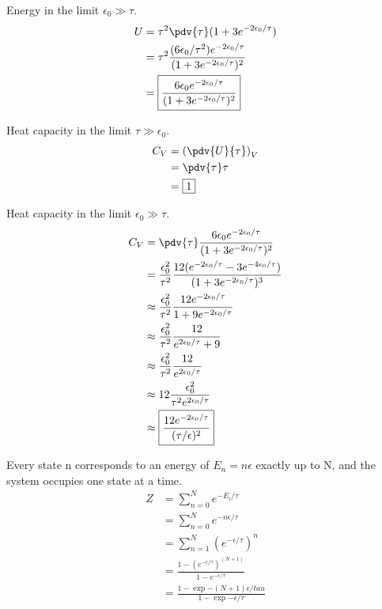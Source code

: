 \documentclass[newpage]{homework}
\begin{document}
Energy in the limit $\epsilon_0 \gg \tau$.
\begin{align*}
    U	&=	\tau^2 \pdv{\tau} (1 + 3e^{-2\epsilon_0/\tau})	\\
        &=	\tau^2 \frac{(6\epsilon_0/\tau^2) e^{-2\epsilon_0/\tau}}{(1 + 3e^{-2\epsilon_0/\tau})^2}	\\
        &= \boxed{\frac{6\epsilon_0 e^{-2\epsilon_0/\tau}}{(1 + 3e^{-2\epsilon_0/\tau})^2}}	\\
\end{align*}

Heat capacity in the limit $\tau \gg \epsilon_0$.
\begin{align*}
    C_V	&=	\left(\pdv{U}{\tau}\right)_V	\\
        &=  \pdv{\tau} \tau \\
        &=  \boxed{1}
\end{align*}

Heat capacity in the limit $\epsilon_0 \gg \tau$.
\begin{align*}
    C_V	&=	\pdv{\tau} \frac{6\epsilon_0 e^{-2\epsilon_0/\tau}}{(1 + 3e^{-2\epsilon_0/\tau})^2}	\\
        &=  \frac{\epsilon_0^2}{\tau^2} \frac{12(e^{-2\epsilon_0/\tau} - 3e^{-4\epsilon_0/\tau})}{(1 + 3e^{-2\epsilon_0/\tau})^3}  \\
        &\approx  \frac{\epsilon_0^2}{\tau^2} \frac{12e^{-2\epsilon_0/\tau}}{1 + 9e^{-2\epsilon_0/\tau}}  \\
        &\approx  \frac{\epsilon_0^2}{\tau^2} \frac{12}{e^{2\epsilon_0/\tau}+ 9}  \\
        &\approx  \frac{\epsilon_0^2}{\tau^2} \frac{12}{e^{2\epsilon_0/\tau}}  \\
        &\approx  12\frac{\epsilon_0^2}{\tau^2 e^{2\epsilon_0/\tau}}  \\
        &\approx  \boxed{\frac{12e^{-2\epsilon_0/\tau}}{(\tau/\epsilon)^2}}  \\
\end{align*}


\question
Every state n corresponds to an energy of $E_n = n\epsilon$ exactly up to N, and the system occupies one state at a time.
\begin{align*}
    Z	&=	\sum_{n=0}^N e^{-E_i/\tau}	\\
        &=	\sum_{n=0}^{N} e^{-n\epsilon/\tau}	\\
        &=	\sum_{n=1}^{N} (e^{-\epsilon/\tau})^n	\\
        &=	\frac{1-(e^{-\epsilon/\tau})^{(N+1)}}{1-e^{-\epsilon/\tau}}	\\
        &=	\boxed{\frac{1-\exp{-(N+1)\epsilon/tau}}{1-\exp{-\epsilon/\tau}}}	\\
\end{align*}
\end{document}
